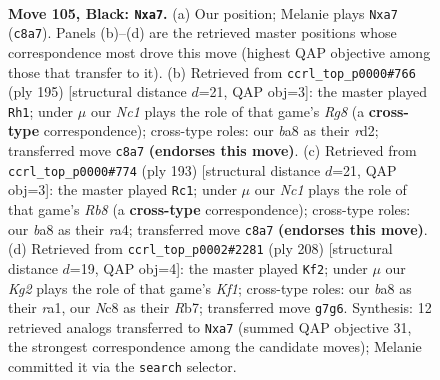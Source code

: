 \documentclass[11pt]{article}
\begin{document}
\clearpage

\begin{figure}[p]\centering
\begin{subfigure}{0.46\textwidth}\centering
\resizebox{\linewidth}{!}{%
\newchessgame
\chessboard[
  setfen={B1n5/P5k1/8/6P1/7K/7P/2P5/8 b - - 2 105},
  showmover=false,
  pgfstyle=straightmove, color=movearrow, markmove={c8-a7}
]}
\caption{}
\end{subfigure}\hfill
\begin{subfigure}{0.46\textwidth}\centering
\resizebox{\linewidth}{!}{%
\newchessgame
\chessboard[
  setfen={8/k7/P1K5/2P5/8/8/3R4/6r1 b - - 58 98},
  showmover=false,
  pgfstyle=straightmove, color=movearrow, markmove={g1-h1}
]}
\caption{}
\end{subfigure}
\\[4pt]
\begin{subfigure}{0.46\textwidth}\centering
\resizebox{\linewidth}{!}{%
\newchessgame
\chessboard[
  setfen={8/7k/5K1P/5P2/R7/8/8/1r6 b - - 26 97},
  showmover=false,
  pgfstyle=straightmove, color=movearrow, markmove={b1-c1}
]}
\caption{}
\end{subfigure}\hfill
\begin{subfigure}{0.46\textwidth}\centering
\resizebox{\linewidth}{!}{%
\newchessgame
\chessboard[
  setfen={8/1R6/8/5p2/5k2/5p2/8/r4K2 w - - 6 105},
  showmover=false,
  pgfstyle=straightmove, color=movearrow, markmove={f1-f2}
]}
\caption{}
\end{subfigure}
\caption{\textbf{Move 105, Black: \texttt{Nxa7}.} (a) Our position; Melanie plays \texttt{Nxa7} (\texttt{c8a7}). Panels (b)--(d) are the retrieved master positions whose correspondence most drove this move (highest QAP objective among those that transfer to it). (b) Retrieved from \texttt{ccrl\_top\_p0000\#766} (ply 195) [structural distance $d$=21, QAP obj=3]: the master played \texttt{Rh1}; under $\mu$ our \emph{Nc1} plays the role of that game's \emph{Rg8} (a \textbf{cross-type} correspondence); cross-type roles: our \emph{b}a8 as their \emph{r}d2; transferred move \texttt{c8a7} \textbf{(endorses this move)}. (c) Retrieved from \texttt{ccrl\_top\_p0000\#774} (ply 193) [structural distance $d$=21, QAP obj=3]: the master played \texttt{Rc1}; under $\mu$ our \emph{Nc1} plays the role of that game's \emph{Rb8} (a \textbf{cross-type} correspondence); cross-type roles: our \emph{b}a8 as their \emph{r}a4; transferred move \texttt{c8a7} \textbf{(endorses this move)}. (d) Retrieved from \texttt{ccrl\_top\_p0002\#2281} (ply 208) [structural distance $d$=19, QAP obj=4]: the master played \texttt{Kf2}; under $\mu$ our \emph{Kg2} plays the role of that game's \emph{Kf1}; cross-type roles: our \emph{b}a8 as their \emph{r}a1, our \emph{N}c8 as their \emph{R}b7; transferred move \texttt{g7g6}. Synthesis: 12 retrieved analogs transferred to \texttt{Nxa7} (summed QAP objective 31, the strongest correspondence among the candidate moves); Melanie committed it via the \texttt{search} selector.}
\label{fig:thought-m209}
\end{figure}
\end{document}
